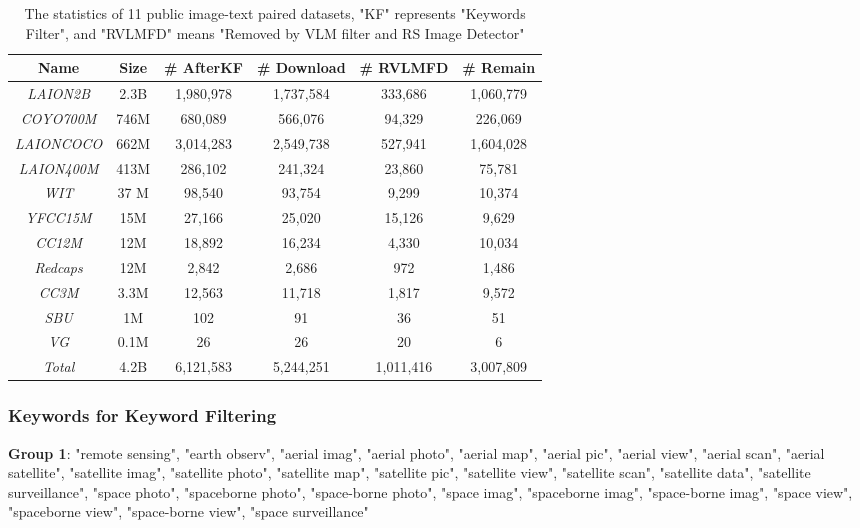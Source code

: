 \documentclass[journal]{IEEEtran}
\begin{document}
\begin{table}[htbp]
\caption{The statistics of 11 public image-text paired datasets, "KF" represents "Keywords Filter", and "RVLMFD" means "Removed by VLM filter and RS Image Detector"}
\label{appendix:pubdataset_stat}
\centering \small
\setlength{\tabcolsep}{1.0pt}
\begin{tabular}{|c|c|c|c|c|c|}\hline
Name & Size & \# AfterKF  & \# Download & \# RVLMFD & \# Remain\\ \hline
\textit{LAION2B} & 2.3B &1,980,978 &1,737,584 & 333,686 & 1,060,779 \\
\textit{COYO700M} & 746M &680,089&566,076 & 94,329 & 226,069 \\
\textit{LAIONCOCO} & 662M &3,014,283&2,549,738 & 527,941 & 1,604,028\\
\textit{LAION400M} & 413M &286,102&241,324 & 23,860 & 75,781\\
\textit{WIT} & 37 M &98,540&93,754 & 9,299 & 10,374 \\
\textit{YFCC15M} & 15M &27,166&25,020 & 15,126 & 9,629\\
\textit{CC12M} & 12M &18,892&16,234 & 4,330 & 10,034\\
\textit{Redcaps} & 12M &2,842&2,686 & 972 & 1,486\\
\textit{CC3M} & 3.3M &12,563&11,718 & 1,817 & 9,572\\
\textit{SBU} & 1M &102&91 & 36 &51\\
\textit{VG} & 0.1M &26&26 & 20 & 6\\
\textit{Total} & 4.2B &6,121,583&5,244,251 & 1,011,416 & 3,007,809\\ \hline
\end{tabular}
\end{table}

\subsubsection{Keywords for Keyword Filtering} \label{keywords}
\textbf{Group 1}:    "remote sensing", "earth observ", "aerial imag", "aerial photo", "aerial map", "aerial pic", "aerial view", "aerial scan", "aerial satellite", "satellite imag", "satellite photo", "satellite map", "satellite pic", "satellite view", "satellite scan", "satellite data", "satellite surveillance", "space photo", "spaceborne photo", "space-borne photo", "space imag", "spaceborne imag", "space-borne imag", "space view", "spaceborne view", "space-borne view", "space surveillance"
\end{document}

